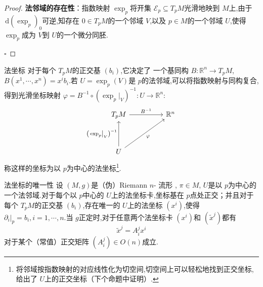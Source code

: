 \documentclass[../../几何与拓扑.tex]{subfiles}
\begin{document}
\begin{proof}
\textbf{ 法邻域的存在性}：指数映射 \(  \exp _{p}  \)将开集 \(  \mathscr{E}_{p}\subseteq T_{p}M  \)光滑地映到 \(  M  \)上,由于 \(  \,\mathrm{d} \left( \exp _{p} \right)_{0}   \)可逆,知存在 \(  0 \in T_{p}M  \)的一个邻域 \(  V  \),以及 \(  p \in M  \)的一个邻域 \(  U  \),使得 \(  \exp _{p}  \)成为 \(  V  \)到 \(  U  \)的一个微分同胚.           

    \hfill $\square$
\end{proof}

\begin{definition}{法坐标}
    对于每个 \(  T_{p}M  \)的正交基 \(  \left( b_{i} \right)   \),它决定了 一个基同构 \(  B: \mathbb{R} ^{n}\to T_{p}M  \), \(  B\left(  x^1,\cdots,x^n  \right)= x^{i}b_{i}   \).若 \(  U =  \exp _{p}\left( V \right)   \)是 \(  p  \)的法邻域,可以将指数映射与同构复合,得到光滑坐标映射 \(   \varphi =  B^{-1} \circ \left( \exp _{p}|_{V} \right)^{-1} :U\to \mathbb{R} ^{n}   \): 
    \[\begin{tikzcd}
     { T_{p}M  } && {\mathbb{R} ^{n}} \\
     \\
     U
     \arrow["{ B^{-1} }", from=1-1, to=1-3]
     \arrow["{ \left( \left. \exp _{p} \right|_{V} \right)^{-1}  }", from=3-1, to=1-1]
     \arrow["{\varphi }"', from=3-1, to=1-3]
 \end{tikzcd}\]  称这样的坐标为以 \(  p  \)为中心的法坐标\footnote{将邻域按指数映射的对应线性化为切空间,切空间上可以轻松地找到正交坐标,给出了 \(  U  \)上的正交坐标（下个命题中证明）. }.    
\end{definition}

\begin{proposition}{法坐标的唯一性}\label{法坐标的唯一性}
    设 \(  \left( M,g \right)   \)是（伪）Riemann \(  n  \)- 流形 , \(  \pi \in M  \), \(  U  \)是以 \(  p  \)为中心的一个法邻域.对于每个以 \(  p  \)中心的 \(  U  \)上的法坐标卡,坐标基在 \(  p  \)点处正交；并且对于每个 \(  T_{p}M  \)的正交基 \(  \left( b_{i} \right)   \),存在唯一的 \(  U  \)上的法坐标 \(  \left( x^{i} \right)   \),使得 \(  \left. \partial _{i} \right|_{p}= b_{i},i=  1,\cdots,n   \).当 \(  g  \)正定时,对于任意两个法坐标卡 \(  \left( x^{i} \right)   \)和 \(  \left( \tilde{x}^{j} \right)   \)都有 \[
    \tilde{x}^{j}= A_{i}^{j}x^{i}
    \]           对于某个（常值）正交矩阵 \(  \left( A_{i}^{j} \right)\in O\left( n \right)    \)成立.    
\end{proposition}
\end{document}

